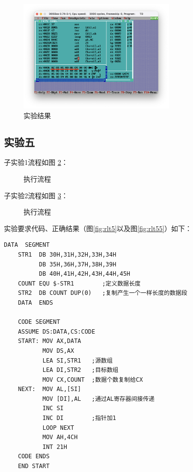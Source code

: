 \documentclass[11pt]{SEU-Digital-Report}
\begin{document}
\begin{figure}[htbp]
    \centering
    \includegraphics[width=0.7\textwidth]{fig/rlt4.png}
    \caption{实验结果}
    \label{fig:rlt4}
\end{figure}

\subsection{实验五}
子实验1流程如图 \ref{fig:exp351}：
\begin{figure}[hbpt]
    \centering
    
    \caption{执行流程}
    \label{fig:exp351}
\end{figure}
子实验2流程如图 \ref{fig:exp352}：
\begin{figure}[hbpt]
    \centering
    
    \caption{执行流程}
    \label{fig:exp352}
\end{figure}

实验要求代码、正确结果（图\ref{fig:rlt5}以及图\ref{fig:rlt55}）如下：
\begin{lstlisting}[language={[x86masm]Assembler},title=exp351.asm]
    DATA  SEGMENT
    STR1  DB 30H,31H,32H,33H,34H
          DB 35H,36H,37H,38H,39H
          DB 40H,41H,42H,43H,44H,45H
    COUNT EQU $-STR1        ;定义数据长度
    STR2  DB COUNT DUP(0)   ;复制产生一个一样长度的数据段
    DATA  ENDS
    
    CODE SEGMENT
    ASSUME DS:DATA,CS:CODE
    START: MOV AX,DATA
           MOV DS,AX
           LEA SI,STR1   ;源数组
           LEA DI,STR2   ;目标数组
           MOV CX,COUNT  ;数据个数复制给CX
    NEXT:  MOV AL,[SI]
           MOV [DI],AL   ;通过AL寄存器间接传递
           INC SI        
           INC DI        ;指针加1
           LOOP NEXT
           MOV AH,4CH
           INT 21H
    CODE ENDS
    END START    
\end{lstlisting}
\end{document}
